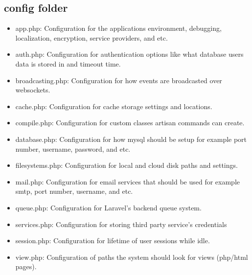 \subsection{config folder}
\begin{itemize}
    \item app.php: Configuration for the applications environment, debugging, localization, encryption, service providers, and etc.
    \item auth.php: Configuration for authentication options like what database users data is stored in and timeout time.
    \item broadcasting.php: Configuration for how events are broadcasted over websockets.
    \item cache.php: Configuration for cache storage settings and locations.
    \item compile.php: Configuration for custom classes artisan commands can create.
    \item database.php: Configuration for how mysql should be setup for example port number, username, password, and etc.
    \item filesystems.php: Configuration for local and cloud disk paths and settings.
    \item mail.php: Configuration for email services that should be used for example smtp, port number, username, and etc.
    \item queue.php: Configuration for Laravel's backend queue system.
    \item services.php: Configuration for storing third party service's credentials
    \item session.php: Configuration for lifetime of user sessions while idle.
    \item view.php: Configuration of paths the system should look for views (php/html pages).
\end{itemize}


